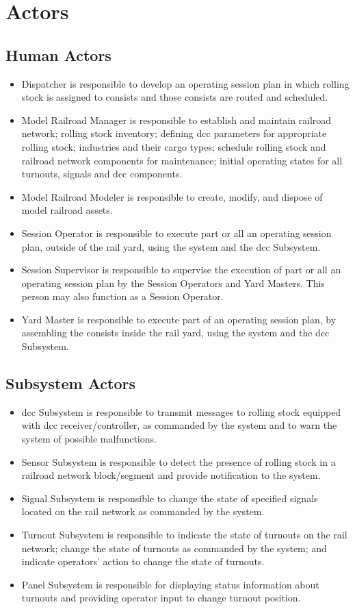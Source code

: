 \section{Actors}
\subsection{Human Actors}
\begin{itemize}
  \item Dispatcher is responsible to develop an operating session plan in which rolling stock is assigned to consists and those consists are routed and scheduled.
  \item Model Railroad Manager is responsible to establish and maintain railroad network; rolling stock inventory; defining \gls{dcc} parameters for appropriate rolling stock; industries and their cargo types; schedule rolling stock and railroad network components for maintenance; initial operating states for all turnouts, signals and \gls{dcc} components.
  \item Model Railroad Modeler is responsible to create, modify, and dispose of model railroad assets.
  \item Session Operator is responsible to execute part or all an operating session plan, outside of the rail yard, using the system and the \gls{dcc} Subsystem.
  \item Session Supervisor is responsible to supervise the execution of part or all an operating session plan by the Session Operators and Yard Masters. This person may also function as a Session Operator.
  \item Yard Master is responsible to execute part of an operating session plan, by assembling the consists inside the rail yard, using the system and the \gls{dcc} Subsystem.
\end{itemize}
\subsection{Subsystem Actors}
\begin{itemize}
  \item \gls{dcc} Subsystem is responsible to transmit messages to rolling stock equipped with \gls{dcc} receiver/controller, as commanded by the system and to warn the system of possible malfunctions.
  \item Sensor Subsystem is responsible to detect the presence of rolling stock in a railroad network block/segment and provide notification to the system.
  \item Signal Subsystem is responsible to change the state of specified signals located on the rail network as commanded by the system.
  \item Turnout Subsystem is responsible to indicate the state of turnouts on the rail network; change the state of turnouts as commanded by the system; and indicate operators’ action to change the state of turnouts.
  \item Panel Subsystem is responsible for displaying status information about turnouts and providing operator input to change turnout position.
\end{itemize}
